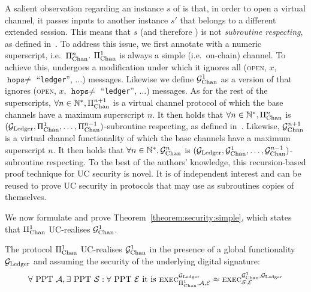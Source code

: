   A salient observation regarding an instance $s$ of \pchan is that, in order to
  open a virtual channel, it passes inputs to another \pchan instance $s'$ that
  belongs to a different extended session. This means that $s$ (and therefore
  \pchan) is not \emph{subroutine respecting}, as defined in~\cite{uc}. To
  address this issue, we first annotate \pchan with a numeric superscript, i.e.\
  $\Pi_{\mathrm{Chan}}^{n}$. $\Pi_{\mathrm{Chan}}^{1}$ is always a simple (i.e.\ on-chain) channel. To
  achieve this, \pchan undergoes a modification under which it ignores all
  (\textsc{open}, $x$, $\texttt{hops} \neq$ ``\texttt{ledger}'', $\dots$)
  messages. Likewise we define $\mathcal{G}_{\mathrm{Chan}}^{1}$ as a version of \fchan that
  ignores (\textsc{open}, $x$, $\texttt{hops} \neq$ ``\texttt{ledger}'',
  $\dots$) messages. As for the rest of the superscripts, $\forall n \in
  \mathbb{N}^*, \Pi_{\mathrm{Chan}}^{n+1}$ is a virtual channel protocol \pchan of which
  the base channels have a maximum superscript $n$. It then holds that $\forall
  n \in \mathbb{N}^*, \Pi_{\mathrm{Chan}}^{n}$ is $(\mathcal{G}_{\mathrm{Ledger}}, \Pi_{\mathrm{Chan}}^{1}, \dots,
  \Pi_{\mathrm{Chan}}^{n-1})$-subroutine respecting, as defined
  in~\cite{DBLP:conf/tcc/BadertscherCHTZ20}. Likewise, $\mathcal{G}_{\mathrm{Chan}}^{n+1}$ is a
  virtual channel functionality \fchan of which the base channels have a maximum
  superscript $n$. It then holds that $\forall n \in \mathbb{N}^*, \mathcal{G}_{\mathrm{Chan}}^{n}$
  is $(\mathcal{G}_{\mathrm{Ledger}}, \mathcal{G}_{\mathrm{Chan}}^{1}, \dots, \mathcal{G}_{\mathrm{Chan}}^{n-1})$-subroutine respecting. To
  the best of the authors' knowledge, this recursion-based proof technique for
  UC security is novel. It is of independent interest and can be reused to prove
  UC security in protocols that may use as subroutines copies of themselves.

  We now formulate and prove Theorem~\ref{theorem:security:simple}, which states
  that $\Pi_{\mathrm{Chan}}^{1}$ UC-realises $\mathcal{G}_{\mathrm{Chan}}^{1}$.

\begin{theorem}
  \label{theorem:security:simple}
  The protocol $\Pi_{\mathrm{Chan}}^{1}$ UC-realises $\mathcal{G}_{\mathrm{Chan}}^{1}$ in the presence of a
  global functionality $\mathcal{G}_{\mathrm{Ledger}}$ and assuming the security of the underlying
  digital signature:
  \begin{gather*}
    \forall \text{ PPT } \mathcal{A}, \exists \text{ PPT } \mathcal{S}: \forall
    \text{ PPT } \mathcal{E} \text{ it is }
    \textsc{exec}^{\mathcal{G}_{\mathrm{Ledger}}}_{\Pi_{\mathrm{Chan}}^{1}, \mathcal{A}, \mathcal{E}} \approx
    \textsc{exec}^{\mathcal{G}_{\mathrm{Chan}}^{1}, \mathcal{G}_{\mathrm{Ledger}}}_{\mathcal{S}, \mathcal{E}}
  \end{gather*}
\end{theorem}

